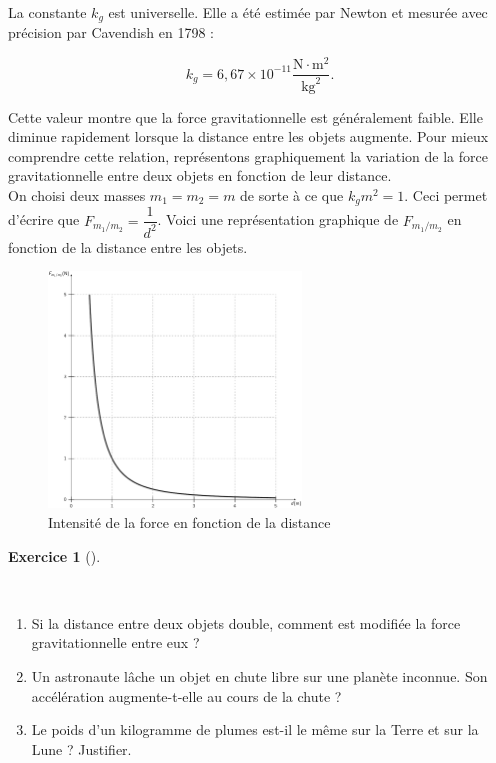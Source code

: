 \documentclass[
  letterpaper,
  DIV=11,
  numbers=noendperiod]{scrartcl}
\providecommand{\tightlist}{%
  \setlength{\itemsep}{0pt}\setlength{\parskip}{0pt}}\usepackage{longtable,booktabs,array}
\theoremstyle{definition}
\newtheorem{exercise}{Exercice}[section]
\theoremstyle{definition}
\theoremstyle{definition}
\theoremstyle{remark}
\begin{document}
La constante \(k_g\) est universelle. Elle a été estimée par Newton et
mesurée avec précision par Cavendish en 1798 :

\[
k_g = 6,67 \times 10^{-11} \dfrac{\text{N} \cdot \text{m}^2}{\text{kg}^2}.
\]

Cette valeur montre que la force gravitationnelle est généralement
faible. Elle diminue rapidement lorsque la distance entre les objets
augmente. Pour mieux comprendre cette relation, représentons
graphiquement la variation de la force gravitationnelle entre deux
objets en fonction de leur distance.\\
On choisi deux masses \(m_1=m_2=m\) de sorte à ce que \(k_gm^2=1\). Ceci
permet d'écrire que \(F_{m_1/m_2}=\dfrac{1}{d^2}\). Voici une
représentation graphique de \(F_{m_1/m_2}\) en fonction de la distance
entre les objets.

\begin{figure}[H]

{\centering \includegraphics[width=0.6\textwidth,height=\textheight]{figures/grav/fig02.pdf}

}

\caption{Intensité de la force en fonction de la distance}

\end{figure}%

\begin{exercise}[]\protect\hypertarget{exr-refl}{}\label{exr-refl}

~

\begin{enumerate}
\def\labelenumi{\arabic{enumi}.}
\tightlist
\item
  Si la distance entre deux objets double, comment est modifiée la force
  gravitationnelle entre eux ?
\item
  Un astronaute lâche un objet en chute libre sur une planète inconnue.
  Son accélération augmente-t-elle au cours de la chute ?
\item
  Le poids d'un kilogramme de plumes est-il le même sur la Terre et sur
  la Lune ? Justifier.
\end{enumerate}

\end{exercise}
\end{document}
